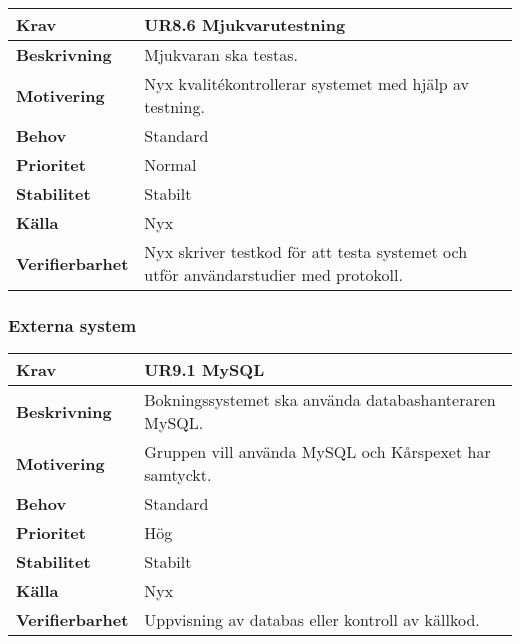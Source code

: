 \documentclass[a4paper, twoside, 11pt, titlepage]{article}
\begin{document}
		\begin{tabular} { p{2.6cm} p{12.5cm} }
			\hline
			\sffamily\textbf{Krav} & \sffamily\textbf{UR8.6 Mjukvarutestning } \\
			\hline
			\sffamily\textbf{Beskrivning} & Mjukvaran ska testas.  \\
			\hline
			\sffamily\textbf{Motivering} & Nyx kvalitékontrollerar systemet med hjälp av testning.  \\
			\hline
			\sffamily\textbf{Behov} & Standard  \\
			\hline
			\sffamily\textbf{Prioritet} & Normal  \\
			\hline
			\sffamily\textbf{Stabilitet} & Stabilt  \\
			\hline
			\sffamily\textbf{Källa} & Nyx  \\
			\hline
			\sffamily\textbf{Verifierbarhet} & Nyx skriver testkod för att testa systemet och utför användarstudier med protokoll.  \\
			\hline
		\end{tabular}


		\subsubsection{Externa system}


		\begin{tabular} { p{2.6cm} p{12.5cm} }
			\hline
			\sffamily\textbf{Krav} & \sffamily\textbf{UR9.1 MySQL } \\
			\hline
			\sffamily\textbf{Beskrivning} & Bokningssystemet ska använda databashanteraren MySQL.  \\
			\hline
			\sffamily\textbf{Motivering} & Gruppen vill använda MySQL och Kårspexet har samtyckt.  \\
			\hline
			\sffamily\textbf{Behov} & Standard  \\
			\hline
			\sffamily\textbf{Prioritet} & Hög  \\
			\hline
			\sffamily\textbf{Stabilitet} & Stabilt  \\
			\hline
			\sffamily\textbf{Källa} & Nyx  \\
			\hline
			\sffamily\textbf{Verifierbarhet} & Uppvisning av databas eller kontroll av källkod.  \\
			\hline
		\end{tabular}
		\vspace{6mm}
\end{document}
